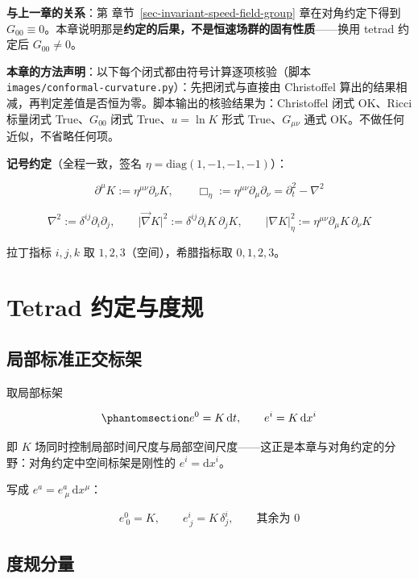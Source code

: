 \documentclass[
  chinese,
  a4paper,
  UTF8,
  12pt,
  oneside,
  openany]{ctexbook}
\theoremstyle{plain}
\theoremstyle{plain}
\theoremstyle{plain}
\theoremstyle{definition}
\theoremstyle{plain}
\theoremstyle{plain}
\theoremstyle{remark}
\begin{document}
\textbf{与上一章的关系}：第 章节~\ref{sec-invariant-speed-field-group}
章在对角约定下得到
\(G_{00}\equiv0\)。本章说明那是\textbf{约定的后果，不是恒速场群的固有性质}------换用
tetrad 约定后 \(G_{00}\neq0\)。

\textbf{本章的方法声明}：以下每个闭式都由符号计算逐项核验（脚本
\texttt{images/conformal-curvature.py}）：先把闭式与直接由 Christoffel
算出的结果相减，再判定差值是否恒为零。脚本输出的核验结果为：Christoffel
闭式 OK、Ricci 标量闭式 True、\(G_{00}\) 闭式 True、\(u=\ln K\) 形式
True、\(G_{\mu\nu}\) 通式 OK。不做任何近似，不省略任何项。

\textbf{记号约定}（全程一致，签名 \(\eta=\mathrm{diag}(1,-1,-1,-1)\)）：

\[
\partial^{\mu}K:=\eta^{\mu\nu}\partial_\nu K,\qquad
\Box_\eta:=\eta^{\mu\nu}\partial_\mu\partial_\nu=\partial_t^{2}-\nabla^{2}
\]

\[
\nabla^{2}:=\delta^{ij}\partial_i\partial_j,\qquad
\lvert\vec\nabla K\rvert^{2}:=\delta^{ij}\partial_iK\,\partial_jK,\qquad
\lvert\nabla K\rvert^{2}_{\eta}:=\eta^{\mu\nu}\partial_{\mu}K\,\partial_{\nu}K
\]

拉丁指标 \(i,j,k\) 取 \(1,2,3\)（空间），希腊指标取 \(0,1,2,3\)。

\section{Tetrad 约定与度规}\label{sec-isd-metric}

\subsection{局部标准正交标架}\label{ux5c40ux90e8ux6807ux51c6ux6b63ux4ea4ux6807ux67b6}

取局部标架

\begin{equation}\protect\phantomsection\label{eq-isd-tetrad}{
e^{0}=K\,\mathrm{d}t,\qquad e^{i}=K\,\mathrm{d}x^{i}
}\end{equation}

即 \(K\)
场同时控制局部时间尺度与局部空间尺度------这正是本章与对角约定的分野：对角约定中空间标架是刚性的
\(e^{i}=\mathrm{d}x^{i}\)。

写成 \(e^{a}=e^{a}_{\ \mu}\,\mathrm{d}x^{\mu}\)：

\[
e^{0}_{\ 0}=K,\qquad e^{i}_{\ j}=K\,\delta^{i}_{j},\qquad \text{其余为 }0
\]

\subsection{度规分量}\label{ux5ea6ux89c4ux5206ux91cf}
\end{document}
